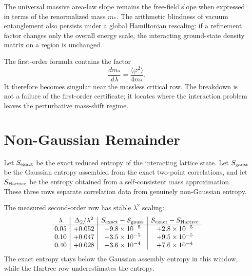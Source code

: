 \begin{corollary}
\label{cor:innovation-input-interaction-massive-slope-inherited}
The universal massive area-law slope remains the free-field slope when
expressed in terms of the renormalized mass $m_*$. The arithmetic blindness
of vacuum entanglement also persists under a global Hamiltonian rescaling:
if a refinement factor changes only the overall energy scale, the
interacting ground-state density matrix on a region is unchanged.
\end{corollary}

\begin{principle}
\label{prin:innovation-input-interaction-critical-boundary}
The first-order formula contains the factor
$$
\frac{dm_*}{d\lambda}
=
\frac{\langle\varphi^2\rangle}{4m_*}.
$$
It therefore becomes singular near the massless critical row. The
breakdown is not a failure of the first-order certificate; it locates where
the interaction problem leaves the perturbative mass-shift regime.
\end{principle}

\section{Non-Gaussian Remainder}
\label{sec:innovation-input-interaction-nongaussian-remainder}

\begin{definition}
\label{def:innovation-input-interaction-gaussian-assembly-comparison}
Let $S_{\rm exact}$ be the exact reduced entropy of the interacting
lattice state. Let $S_{\rm gauss}$ be the Gaussian entropy assembled from
the exact two-point correlations, and let $S_{\rm Hartree}$ be the entropy
obtained from a self-consistent mass approximation. These three rows
separate correlation data from genuinely non-Gaussian entropy.
\end{definition}

\begin{principle}
\label{prin:innovation-input-interaction-quadratic-order-witness}
The measured second-order row has stable $\lambda^2$ scaling:
$$
\begin{array}{c|c|c|c}
\lambda & \Delta_2/\lambda^2
& S_{\rm exact}-S_{\rm gauss}
& S_{\rm exact}-S_{\rm Hartree}\\
\hline
0.05 & +0.052 & -9.8\times10^{-6} & +2.8\times10^{-5}\\
0.10 & +0.047 & -3.5\times10^{-5} & +9.5\times10^{-5}\\
0.40 & +0.028 & -3.6\times10^{-4} & +7.6\times10^{-4}
\end{array}
$$
The exact entropy stays below the Gaussian assembly entropy in this
window, while the Hartree row underestimates the entropy.
\end{principle}

